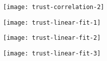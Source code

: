 \documentclass[t]{beamer}
\begin{document}
	\begin{frame}[c] %
			
		\begin{center}
			\texttt{[image: trust-correlation-2]}
		\end{center}
				
	\end{frame}
		



	\begin{frame}[c] %
			
		\begin{center}
			\texttt{[image: trust-linear-fit-1]}
		\end{center}
				
	\end{frame}

	\begin{frame}[c] %
			
		\begin{center}
			\texttt{[image: trust-linear-fit-2]}
		\end{center}
				
	\end{frame}

	\begin{frame}[c] %
			
		\begin{center}
			\texttt{[image: trust-linear-fit-3]}
		\end{center}
				
	\end{frame}
	
\end{document}
